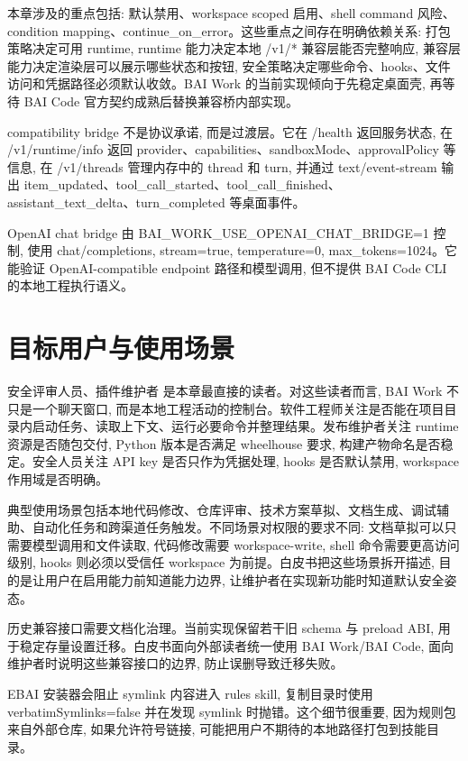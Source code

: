 本章涉及的重点包括: 默认禁用、workspace scoped 启用、shell command 风险、condition mapping、continue\_on\_error。这些重点之间存在明确依赖关系: 打包策略决定可用 runtime, runtime 能力决定本地 /v1/* 兼容层能否完整响应, 兼容层能力决定渲染层可以展示哪些状态和按钮, 安全策略决定哪些命令、hooks、文件访问和凭据路径必须默认收敛。BAI Work 的当前实现倾向于先稳定桌面壳, 再等待 BAI Code 官方契约成熟后替换兼容桥内部实现。

compatibility bridge 不是协议承诺, 而是过渡层。它在 /health 返回服务状态, 在 /v1/runtime/info 返回 provider、capabilities、sandboxMode、approvalPolicy 等信息, 在 /v1/threads 管理内存中的 thread 和 turn, 并通过 text/event-stream 输出 item\_updated、tool\_call\_started、tool\_call\_finished、assistant\_text\_delta、turn\_completed 等桌面事件。

OpenAI chat bridge 由 BAI\_WORK\_USE\_OPENAI\_CHAT\_BRIDGE=1 控制, 使用 chat/completions, stream=true, temperature=0, max\_tokens=1024。它能验证 OpenAI-compatible endpoint 路径和模型调用, 但不提供 BAI Code CLI 的本地工程执行语义。

\section{目标用户与使用场景}
安全评审人员、插件维护者 是本章最直接的读者。对这些读者而言, BAI Work 不只是一个聊天窗口, 而是本地工程活动的控制台。软件工程师关注是否能在项目目录内启动任务、读取上下文、运行必要命令并整理结果。发布维护者关注 runtime 资源是否随包交付, Python 版本是否满足 wheelhouse 要求, 构建产物命名是否稳定。安全人员关注 API key 是否只作为凭据处理, hooks 是否默认禁用, workspace 作用域是否明确。

典型使用场景包括本地代码修改、仓库评审、技术方案草拟、文档生成、调试辅助、自动化任务和跨渠道任务触发。不同场景对权限的要求不同: 文档草拟可以只需要模型调用和文件读取, 代码修改需要 workspace-write, shell 命令需要更高访问级别, hooks 则必须以受信任 workspace 为前提。白皮书把这些场景拆开描述, 目的是让用户在启用能力前知道能力边界, 让维护者在实现新功能时知道默认安全姿态。

历史兼容接口需要文档化治理。当前实现保留若干旧 schema 与 preload ABI, 用于稳定存量设置迁移。白皮书面向外部读者统一使用 BAI Work/BAI Code, 面向维护者时说明这些兼容接口的边界, 防止误删导致迁移失败。

EBAI 安装器会阻止 symlink 内容进入 rules skill, 复制目录时使用 verbatimSymlinks=false 并在发现 symlink 时抛错。这个细节很重要, 因为规则包来自外部仓库, 如果允许符号链接, 可能把用户不期待的本地路径打包到技能目录。

